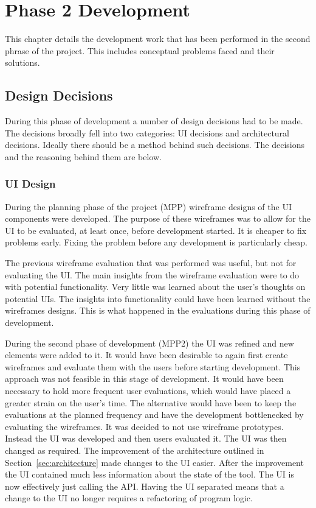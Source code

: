 \chapter{Phase 2 Development}
\label{chap:work}

This chapter details the development work that has been performed in the second phrase of the project.  This includes conceptual problems faced and their solutions.


\section{Design Decisions}
\label{sec:design}

During this phase of development a number of design decisions had to be made.  The decisions broadly fell into two categories:  \ac{UI} decisions and architectural decisions.  Ideally there should be a method behind such decisions.  The decisions and the reasoning behind them are below.

\subsection{UI Design}

During the planning phase of the project (MPP) wireframe designs of the \ac{UI} components were developed.  The purpose of these wireframes was to allow for the \ac{UI} to be evaluated, at least once, before development started.  It is cheaper to fix problems early. Fixing the problem before any development is particularly cheap.

The previous wireframe evaluation that was performed was useful, but not for evaluating the \ac{UI}.  The main insights from the wireframe evaluation were to do with potential functionality.  Very little was learned about the user's thoughts on potential \acp{UI}.  The insights into functionality could have been learned without the wireframes designs.  This is what happened in the evaluations during this phase of development.

During the second phase of development (MPP2) the \ac{UI} was refined and new elements were added to it.  It would have been desirable to again first create wireframes and evaluate them with the users before starting development.  This approach was not feasible in this stage of development.  It would have been necessary to hold more frequent user evaluations, which would have placed a greater strain on the user's time.  The alternative would have been to keep the evaluations at the planned frequency and have the development bottlenecked by evaluating the wireframes.  It was decided to not use wireframe prototypes. Instead the \ac{UI} was developed and then users evaluated it.  The \ac{UI} was then changed as required.  The improvement of the architecture outlined in Section~\ref{sec:architecture} made changes to the \ac{UI} easier.  After the improvement the \ac{UI} contained much less information about the state of the tool.  The \ac{UI} is now effectively just calling the \ac{API}.  Having the \ac{UI} separated means that a change to the \ac{UI} no longer requires a refactoring of program logic.

